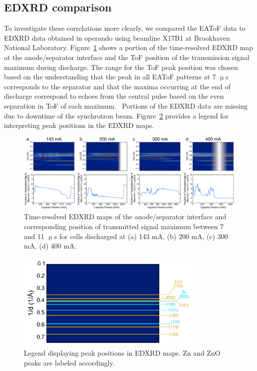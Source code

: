 \subsection{EDXRD comparison}

To investigate these correlations more clearly, we compared the EAToF data to EDXRD data obtained in operando using beamline X17B1 at Brookhaven National Laboratory. Figure~\ref{fig:eatofedxrd} shows a portion of the time-resolved EDXRD map at the anode/separator interface and the ToF position of the transmission signal maximum during discharge. The range for the ToF peak position was chosen based on the understanding that the peak in all EAToF patterns at 7 $\upmu$s corresponds to the separator and that the maxima occurring at the end of discharge correspond to echoes from the central pulse based on the even separation in ToF of each maximum.~\cite{Trusler1991-ok} Portions of the EDXRD data are missing due to downtime of the synchrotron beam. Figure~\ref{fig:edxrdmap} provides a legend for interpreting peak positions in the EDXRD maps.

\begin{figure}[htb]
  \centering
    \includegraphics[width=1.00\textwidth]{ch5-alkbw/images/eatofedxrd.png}
    \caption[EDXRD maps of the anode/separator interface and transmitted EAToF max. position.]{Time-resolved EDXRD maps of the anode/separator interface and corresponding position of transmitted signal maximum between 7 and 11 $\upmu$s for cells discharged at (a) 143 mA, (b) 200 mA, (c) 300 mA, (d) 400 mA.}
    \label{fig:eatofedxrd}
\end{figure}

\begin{figure}[htb]
  \centering
    \includegraphics[width=0.8\textwidth]{ch5-alkbw/images/ZnPeakmap.png}
    \caption[Legend displaying peak positions in EDXRD maps.]{Legend displaying peak positions in EDXRD maps. Zn and ZnO peaks are labeled accordingly.}
    \label{fig:edxrdmap}
\end{figure}

